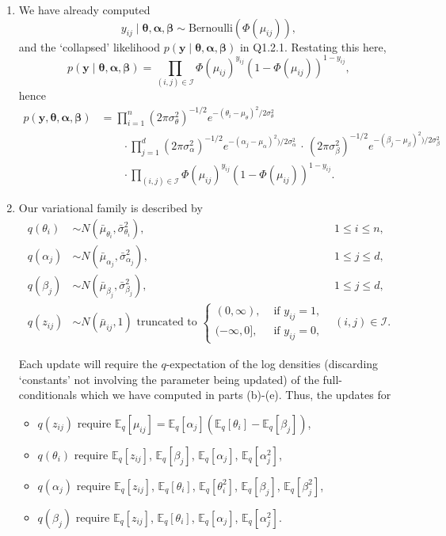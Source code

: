 \documentclass[12pt]{article}
\newcommand{\E}{\mathbb{E}}
\begin{document}
\begin{enumerate}[label=(\alph*)]
    \item We have already computed \[
        y_{ij} \mid \bm{\theta}, \bm{\alpha}, \bm{\beta}
            \sim \text{Bernoulli}(\Phi(\mu_{ij})),
    \] and the `collapsed' likelihood $p(\bm{y}\mid\bm{\theta}, \bm{\alpha},
    \bm{\beta})$ in Q1.2.1.
    Restating this here, \[
        p(\bm{y} \mid \bm{\theta}, \bm{\alpha}, \bm{\beta})
            = \prod_{(i, j) \in \mathscr{I}} \Phi(\mu_{ij})^{y_{ij}} (1 - \Phi(\mu_{ij}))^{1 - y_{ij}},
    \] hence \begin{align*}
        p(\bm{y}, \bm{\theta}, \bm{\alpha}, \bm{\beta})
            &= \prod_{i = 1}^n (2\pi\sigma_\theta^2)^{-1 /2} e^{-(\theta_i - \mu_\theta)^2 /2\sigma_\theta^2} \\
                &\qquad\cdot\prod_{j = 1}^d (2\pi\sigma_\alpha^2)^{-1 /2} e^{-(\alpha_j - \mu_\alpha)^2) /2\sigma_\alpha^2}\,\cdot\,
                    (2\pi\sigma_\beta^2)^{-1 /2} e^{-(\beta_j - \mu_\beta)^2) /2\sigma_\beta^2} \\
                &\qquad\cdot\prod_{(i, j) \in \mathscr{I}} \Phi(\mu_{ij})^{y_{ij}} (1 - \Phi(\mu_{ij}))^{1 - y_{ij}}.
    \end{align*}


    \item Our variational family is described by \begin{align*}
        q(\theta_i) &\sim N(\bar{\mu}_{\theta_i}, \bar{\sigma}_{\theta_i}^2), \quad& 1 \leq i \leq n, \\
        q(\alpha_j) &\sim N(\bar{\mu}_{\alpha_j}, \bar{\sigma}_{\alpha_j}^2), & 1 \leq j \leq d, \\
        q(\beta_j) &\sim N(\bar{\mu}_{\beta_j}, \bar{\sigma}_{\beta_j}^2), & 1 \leq j \leq d, \\
        q(z_{ij}) &\sim N(\bar{\mu}_{ij}, 1) \text{ truncated to } \begin{cases}
            (0, \infty), &\text{ if } y_{ij} = 1, \\
            (-\infty, 0], &\text{ if } y_{ij} = 0,
        \end{cases} &(i, j) \in \mathscr{I}.
    \end{align*}

    Each update will require the $q$-expectation of the log densities
    (discarding `constants' not involving the parameter being updated) of the
    full-conditionals which we have computed in parts (b)-(e).
    Thus, the updates for \begin{itemize}
        \item $q(z_{ij})$ require $\E_q[\mu_{ij}] = \E_q[\alpha_j](\E_q[\theta_i] - \E_q[\beta_j])$,
        \item $q(\theta_i)$ require $\E_q[z_{ij}]$, $\E_q[\beta_j]$, $\E_q[\alpha_j]$, $\E_q[\alpha_j^2]$,
        \item $q(\alpha_j)$ require $\E_q[z_{ij}]$, $\E_q[\theta_i]$, $\E_q[\theta_i^2]$, $\E_q[\beta_j]$, $\E_q[\beta_j^2]$,
        \item $q(\beta_j)$ require $\E_q[z_{ij}]$, $\E_q[\theta_i]$, $\E_q[\alpha_j]$, $\E_q[\alpha_j^2]$.
    \end{itemize}




\end{enumerate}
\end{document}

